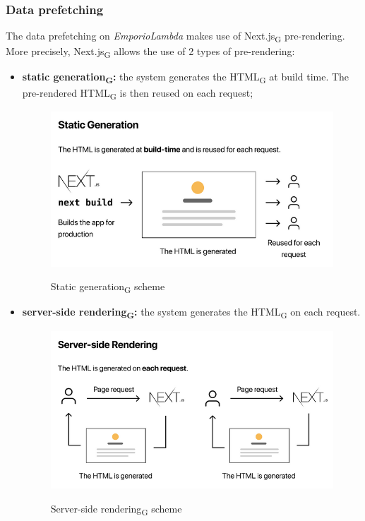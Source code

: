 \subsubsection{Data prefetching}
The data prefetching on \textit{EmporioLambda} makes use of Next.js\textsubscript{G} pre-rendering.\\
More precisely, Next.js\textsubscript{G} allows the use of 2 types of pre-rendering:
\begin{itemize}
\item \textbf{static generation\textsubscript{G}:} the system generates the HTML\textsubscript{G} at build time. The pre-rendered HTML\textsubscript{G} is then reused on each request;
\begin{figure}[H]
\centering
\includegraphics[scale=0.70]{res/Architettura/Frontend/img/staticGeneration}\\
\caption{Static generation\textsubscript{G} scheme}
\end{figure}
\vspace{0.7cm}
\item \textbf{server-side rendering\textsubscript{G}:} the system generates the HTML\textsubscript{G} on each request.
\begin{figure}[H]
\centering
\includegraphics[scale=0.70]{res/Architettura/Frontend/img/serverSideRendering}\\
\caption{Server-side rendering\textsubscript{G} scheme}
\end{figure}
\vspace{0.7cm}
\end{itemize}
